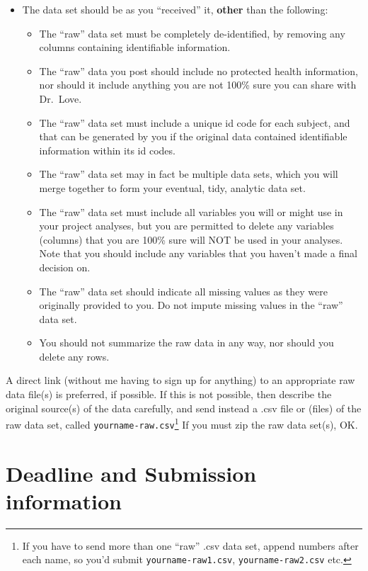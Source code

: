 \documentclass[]{book}
\providecommand{\tightlist}{%
  \setlength{\itemsep}{0pt}\setlength{\parskip}{0pt}}
\let\rmarkdownfootnote\footnote%
\def\footnote{\protect\rmarkdownfootnote}
\begin{document}
\begin{itemize}
\tightlist
\item
  The data set should be as you ``received'' it, \textbf{other} than the following:

  \begin{itemize}
  \tightlist
  \item
    The ``raw'' data set must be completely de-identified, by removing any columns containing identifiable information.
  \item
    The ``raw'' data you post should include no protected health information, nor should it include anything you are not 100\% sure you can share with Dr.~Love.
  \item
    The ``raw'' data set must include a unique id code for each subject, and that can be generated by you if the original data contained identifiable information within its id codes.
  \item
    The ``raw'' data set may in fact be multiple data sets, which you will merge together to form your eventual, tidy, analytic data set.
  \item
    The ``raw'' data set must include all variables you will or might use in your project analyses, but you are permitted to delete any variables (columns) that you are 100\% sure will NOT be used in your analyses. Note that you should include any variables that you haven't made a final decision on.
  \item
    The ``raw'' data set should indicate all missing values as they were originally provided to you. Do not impute missing values in the ``raw'' data set.
  \item
    You should not summarize the raw data in any way, nor should you delete any rows.
  \end{itemize}
\end{itemize}

A direct link (without me having to sign up for anything) to an appropriate raw data file(s) is preferred, if possible. If this is not possible, then describe the original source(s) of the data carefully, and send instead a .csv file or (files) of the raw data set, called \texttt{yourname-raw.csv}\footnote{If you have to send more than one ``raw'' .csv data set, append numbers after each name, so you'd submit \texttt{yourname-raw1.csv}, \texttt{yourname-raw2.csv} etc.} If you must zip the raw data set(s), OK.

\hypertarget{deadline-and-submission-information-6}{%
\section{Deadline and Submission information}\label{deadline-and-submission-information-6}}
\end{document}
